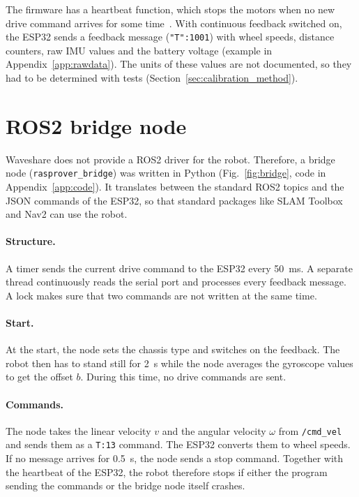 The firmware has a heartbeat function, which stops the motors when no new drive command arrives for some time~\citep{waveshare_json}. With continuous feedback switched on, the ESP32 sends a feedback message (\texttt{"T":1001}) with wheel speeds, distance counters, raw IMU values and the battery voltage (example in Appendix~\ref{app:rawdata}). The units of these values are not documented, so they had to be determined with tests (Section~\ref{sec:calibration_method}).

\section{ROS2 bridge node}
\label{sec:bridge}

Waveshare does not provide a ROS2 driver for the robot. Therefore, a bridge node (\texttt{rasprover\_bridge}) was written in Python (Fig.~\ref{fig:bridge}, code in Appendix~\ref{app:code}). It translates between the standard ROS2 topics and the JSON commands of the ESP32, so that standard packages like SLAM Toolbox and Nav2 can use the robot.



\paragraph{Structure.} A timer sends the current drive command to the ESP32 every \SI{50}{\milli\second}. A separate thread continuously reads the serial port and processes every feedback message. A lock makes sure that two commands are not written at the same time.

\paragraph{Start.} At the start, the node sets the chassis type and switches on the feedback. The robot then has to stand still for \SI{2}{\second} while the node averages the gyroscope values to get the offset $b$. During this time, no drive commands are sent.

\paragraph{Commands.} The node takes the linear velocity $v$ and the angular velocity $\omega$ from \texttt{/cmd\_vel} and sends them as a \texttt{T:13} command. The ESP32 converts them to wheel speeds. If no message arrives for \SI{0.5}{\second}, the node sends a stop command. Together with the heartbeat of the ESP32, the robot therefore stops if either the program sending the commands or the bridge node itself crashes.

